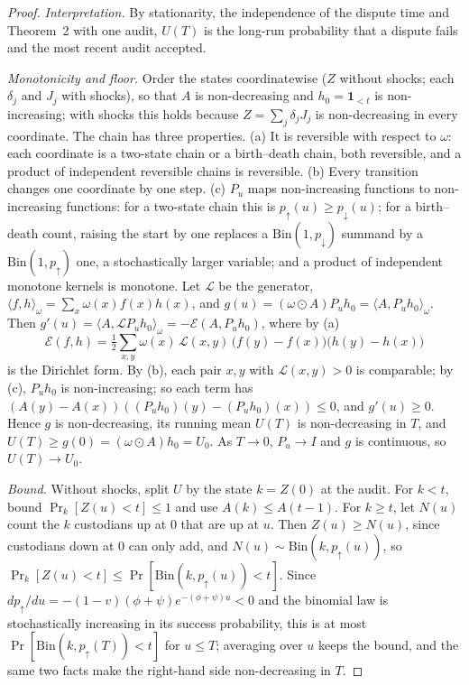 \documentclass[11pt]{article}
\begin{document}
\begin{proof}
\emph{Interpretation.} By stationarity, the independence of the dispute time and Theorem~2 with one audit, $U(T)$ is the long-run probability that a dispute fails and the most recent audit accepted.

\emph{Monotonicity and floor.} Order the states coordinatewise ($Z$ without shocks; each $\delta_j$ and $J_j$ with shocks), so that $A$ is non-decreasing and $h_0=\mathbf{1}_{<t}$ is non-increasing; with shocks this holds because $Z=\sum_j\delta_jJ_j$ is non-decreasing in every coordinate. The chain has three properties.
(a) It is reversible with respect to $\omega$: each coordinate is a two-state chain or a birth--death chain, both reversible, and a product of independent reversible chains is reversible.
(b) Every transition changes one coordinate by one step.
(c) $P_u$ maps non-increasing functions to non-increasing functions: for a two-state chain this is $p_{\uparrow}(u)\ge p_{\downarrow}(u)$; for a birth--death count, raising the start by one replaces a $\mathrm{Bin}(1,p_{\downarrow})$ summand by a $\mathrm{Bin}(1,p_{\uparrow})$ one, a stochastically larger variable; and a product of independent monotone kernels is monotone.
Let $\mathcal{L}$ be the generator, $\langle f,h\rangle_{\omega}=\sum_x\omega(x)f(x)h(x)$, and $g(u)=(\omega\odot A)P_uh_0=\langle A,P_uh_0\rangle_{\omega}$. Then $g'(u)=\langle A,\mathcal{L}P_uh_0\rangle_{\omega}=-\mathcal{E}(A,P_uh_0)$, where by (a)
\[
\mathcal{E}(f,h)=\tfrac12\sum_{x,y}\omega(x)\,\mathcal{L}(x,y)\,\big(f(y)-f(x)\big)\big(h(y)-h(x)\big)
\]
is the Dirichlet form. By (b), each pair $x,y$ with $\mathcal{L}(x,y)>0$ is comparable; by (c), $P_uh_0$ is non-increasing; so each term has $(A(y)-A(x))((P_uh_0)(y)-(P_uh_0)(x))\le0$, and $g'(u)\ge0$. Hence $g$ is non-decreasing, its running mean $U(T)$ is non-decreasing in $T$, and $U(T)\ge g(0)=(\omega\odot A)h_0=U_0$. As $T\to0$, $P_u\to I$ and $g$ is continuous, so $U(T)\to U_0$.

\emph{Bound.} Without shocks, split $U$ by the state $k=Z(0)$ at the audit. For $k<t$, bound $\Pr_k[Z(u)<t]\le1$ and use $A(k)\le A(t-1)$. For $k\ge t$, let $N(u)$ count the $k$ custodians up at $0$ that are up at $u$. Then $Z(u)\ge N(u)$, since custodians down at $0$ can only add, and $N(u)\sim\mathrm{Bin}(k,p_{\uparrow}(u))$, so $\Pr_k[Z(u)<t]\le\Pr[\mathrm{Bin}(k,p_{\uparrow}(u))<t]$. Since $dp_{\uparrow}/du=-(1-v)(\phi+\psi)e^{-(\phi+\psi)u}<0$ and the binomial law is stochastically increasing in its success probability, this is at most $\Pr[\mathrm{Bin}(k,p_{\uparrow}(T))<t]$ for $u\le T$; averaging over $u$ keeps the bound, and the same two facts make the right-hand side non-decreasing in $T$.
\end{proof}
\end{document}
